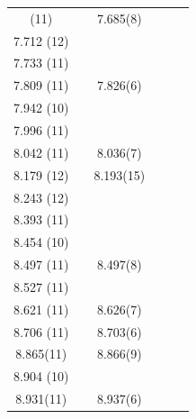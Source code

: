 \begin{center}
\begin{longtable}{cc cc cc}
\endlastfoot
  7.677 (11)      &          &  7.685(8)        &                     &             &                 \\
  7.712 (12)      &          &                  &                     &             &                 \\
  7.733 (11)      &          &                  &                     &             &                 \\
  7.809 (11)      &          &  7.826(6)        &                     &             &                 \\
  7.942 (10)      &          &                  &                     &             &                 \\
  7.996 (11)      &          &                  &                     &             &                 \\
  8.042 (11)      &          &  8.036(7)        &                     &             &                 \\
  8.179 (12)      &          &  8.193(15)       &                     &             &                 \\
  8.243 (12)      &          &                  &                     &             &                 \\
  8.393 (11)      &          &                  &                     &             &                 \\
  8.454 (10)      &          &                  &                     &             &                 \\
  8.497 (11)      &          &  8.497(8)        &                     &             &                 \\
  8.527 (11)      &          &                  &                     &             &                 \\
  8.621 (11)      &          &  8.626(7)        &                     &             &                 \\
  8.706 (11)      &          &  8.703(6)        &                     &             &                 \\
   8.865(11)      &          &  8.866(9)        &                     &             &                 \\
  8.904 (10)      &          &                  &                     &             &                 \\
  8.931(11)       &          &  8.937(6)        &                     &             &                 \\

\end{longtable}
\end{center}

